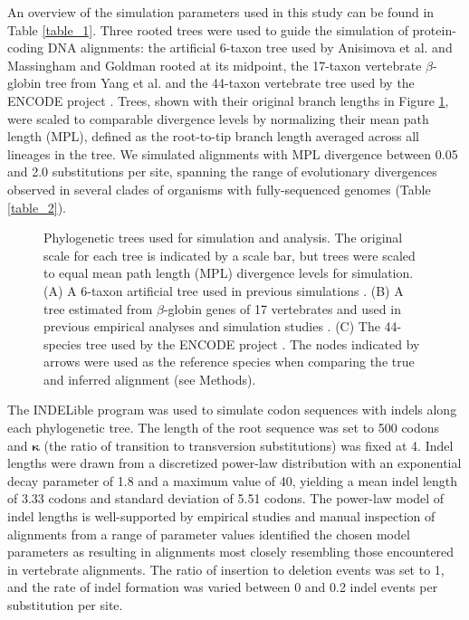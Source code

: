 \documentclass{article}
\begin{document}
An overview of the simulation parameters used in this study can be
found in Table \ref{table_1}. Three rooted trees were used to guide
the simulation of protein-coding DNA alignments: the artificial
6-taxon tree used by Anisimova et al.
\citeyearpar{Anisimova2001Accuracy} and Massingham and Goldman
\citeyearpar{Massingham2005Detecting} rooted at its midpoint, the
17-taxon vertebrate $\beta$-globin tree from Yang et
al. \citeyearpar{Yang2000CodonSubstitution} and the 44-taxon
vertebrate tree used by the ENCODE project
\citep{2007Identification,Nikolaev2007Early}. Trees, shown with their
original branch lengths in Figure \ref{fig_1}, were scaled to
comparable divergence levels by normalizing their mean path length
(MPL), defined as the root-to-tip branch length averaged across all
lineages in the tree. We simulated alignments with MPL divergence
between 0.05 and 2.0 \syn substitutions per \syn site,
spanning the range of evolutionary divergences observed in several
clades of organisms with fully-sequenced genomes (Table
\ref{table_2}).
\begin{figure}[t]
\begin{center}
\end{center}
\caption{Phylogenetic trees used for simulation and analysis. The
  original scale for each tree is indicated by a scale bar, but trees
  were scaled to equal mean path length (MPL) divergence levels for
  simulation. (A) A 6-taxon artificial tree used in previous
  simulations
  \citep{Anisimova2001Accuracy,Massingham2005Detecting}. (B) A tree
  estimated from $\beta$-globin genes of 17 vertebrates and used in
  previous empirical analyses and simulation studies
  \citep{Anisimova2001Accuracy,Anisimova2002Accuracy}. (C) The
  44-species tree used by the ENCODE project
  \citep{2007Identification,Nikolaev2007Early}. The nodes indicated by
  arrows were used as the reference species when comparing the true
  and inferred alignment (see Methods).}
\label{fig_1}
\end{figure}

The INDELible program \citep{Fletcher2009INDELible} was used to
simulate codon sequences with indels along each phylogenetic tree. The
length of the root sequence was set to 500 codons and $\bm{\kappa}$ (the
ratio of transition to transversion substitutions) was fixed at 4.
Indel lengths were drawn from a discretized
power-law distribution with an exponential decay parameter of 1.8 and
a maximum value of 40, yielding a mean indel length of 3.33 codons and
standard deviation of 5.51 codons. The power-law model of indel
lengths is well-supported by empirical studies
\citep{Benner1993Empirical,Cartwright2009Problems} and manual
inspection of alignments from a range of parameter values identified
the chosen model parameters as resulting in alignments most closely
resembling those encountered in vertebrate alignments. The ratio of
insertion to deletion events was set to 1, and the rate of indel
formation was varied between 0 and 0.2 indel events per substitution
per site.
\end{document}
